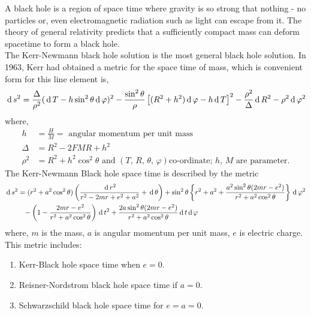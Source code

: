 \documentclass[../main-sheet.tex]{subfiles}
\begin{document}
\begin{soln}
    A black hole is a region of space time where gravity is so strong that nothing - no particles or, even electromagnetic radiation such as light can escape from it. The theory of general relativity predicts that a sufficiently compact mass can deform spacetime to form a black hole.\\


    The Kerr-Newmann black hole solution is the most general black hole solution. In 1963, Kerr had obtained a metric for the space time of mass, which is convenient form for this line element is,
    \begin{equation}
        \,\mathrm{d}\, s^2=\frac{\Delta }{\rho^2}(\,\mathrm{d}\, T-h\sin^2\theta \,\mathrm{d}\, \varphi)^2-\frac{\sin^2 \theta}{\rho}\left[(R^2+h^2)\,\mathrm{d}\,\varphi-h\,\mathrm{d}\, T\right]^2-\frac{\rho^2}{\Delta}\,\mathrm{d}\, R^2-\rho^2\,\mathrm{d}\, \varphi^2 \label{eq:kerr1}
    \end{equation}
    where,
    \begin{align*}
        h&=\frac{H }{M }=\text{ angular momentum per unit mass}\\
        \Delta&=R^2-2FMR+h^2\\
        \rho^2&=R^2+h^2\cos^2\theta\text{ and } (T,\,R,\,\theta,\,\varphi) \text{
        co-ordinate; \(h\), \(M\) are parameter.}
    \end{align*} 
The Kerr-Newmann Black hole space time is described by the metric
\begin{align*}
    \,\mathrm{d}\, s^2&=(r^2+a^2\cos^2\theta)\left(\frac{\,\mathrm{d}\, r^2 }{r^2-2mr+e^2+a^2}+\,\mathrm{d}\,\theta\right)+\sin^2 \theta\left\{r^2+a^2+\frac{a^2 \sin^2 \theta(2mr-e^2)}{r^2+a^2\cos^2\theta}\right\}\,\mathrm{d}\, \varphi^2\\
    &\phantom{=} -\left(1-\frac{2mr-e^2}{r^2+a^2\cos^2\theta}\right)\,\mathrm{d}\, t^2+\frac{2a\sin^2\theta(2mr-e^2)}{r^2+a^2\cos^2\theta}\,\mathrm{d}\, t\,\mathrm{d}\, \varphi
\end{align*}
where, \(m\) is the mass,
\(a\) is angular momentum per unit mass, \(e\) is electric charge.\\



This metric includes:
\begin{enumerate}[label=(\roman*)]
    \item Kerr-Black hole space time when \(e = 0\).
    \item Reisner-Nordstrom black hole space time if \(a = 0\).
    \item Schwarzschild black hole space time for \(e = a = 0\).
\end{enumerate}
\end{soln}
\end{document}
